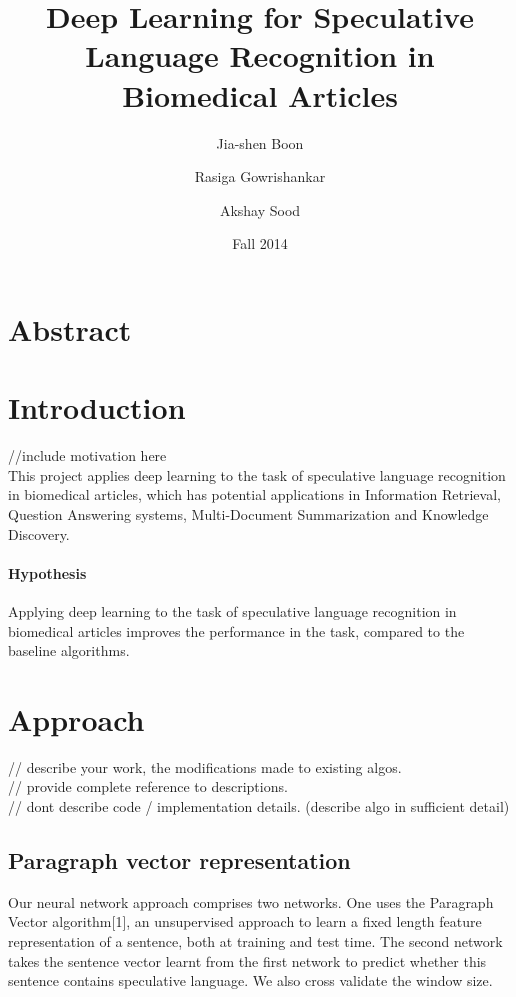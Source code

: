 \documentclass{article}
\begin{document}
\title{Deep Learning for Speculative Language Recognition in Biomedical Articles}
\author{Jia-shen Boon \and Rasiga Gowrishankar \and Akshay Sood}
\date{Fall 2014}
\maketitle

\section*{Abstract}
\section{Introduction}
//include motivation here \\

This project applies deep learning to the task of speculative language recognition in biomedical articles, which has potential applications in Information Retrieval, Question Answering systems, Multi-Document Summarization and Knowledge Discovery. \\

\paragraph{Hypothesis}
Applying deep learning to the task of speculative language recognition in biomedical articles improves the performance in the task, compared to the baseline algorithms.

\section{Approach}
// describe your work, the modifications made to existing algos. \\
// provide complete reference to descriptions. \\
// dont describe code / implementation details. (describe algo in sufficient detail) \\

\subsection*{Paragraph vector representation}
Our neural network approach comprises two networks. One uses the Paragraph Vector algorithm[1], an unsupervised approach to learn a fixed length feature representation of a sentence, both at training and test time. The second network takes the sentence vector learnt from the first network to predict whether this sentence contains speculative language. We also cross validate the window size. \\
\end{document}
